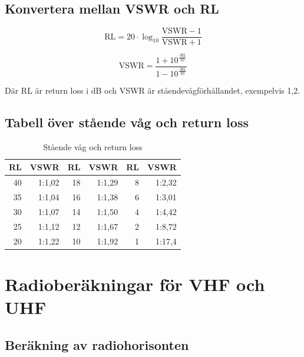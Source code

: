 \subsection{Konvertera mellan VSWR och RL}

\begin{equation}
	\text{RL} = 20 \cdot \log_{10} \frac{\text{VSWR}-1}{\text{VSWR}+1}
\end{equation}

\begin{equation}
	\text{VSWR} = \frac{1+10^\frac{\text{-RL}}{20}}{1-10^\frac{\text{-RL}}{20}}
\end{equation}

Där RL är return loss i dB och VSWR är ståendevågförhållandet, exempelvis 1,2.

\subsection{Tabell över stående våg och return loss}

\begin{table}[H]
\centering
\begin{tabular}{rr|rr|rr}
	\textbf{RL} & \textbf{VSWR} & \textbf{RL} & \textbf{VSWR} & \textbf{RL} & \textbf{VSWR} \\ \hline
	         40 &        1:1,02 &          18 &        1:1,29 &           8 &        1:2,32 \\
	         35 &        1:1,04 &          16 &        1:1,38 &           6 &        1:3,01 \\
	         30 &        1:1,07 &          14 &        1:1,50 &           4 &        1:4,42 \\
	         25 &        1:1,12 &          12 &        1:1,67 &           2 &        1:8,72 \\
	         20 &        1:1,22 &          10 &        1:1,92 &           1 &        1:17,4
\end{tabular}
\caption{Stående våg och return loss}
\label{tab:vswr-rl}
\end{table}

\section{Radioberäkningar för VHF och UHF}

\subsection{Beräkning av radiohorisonten}

